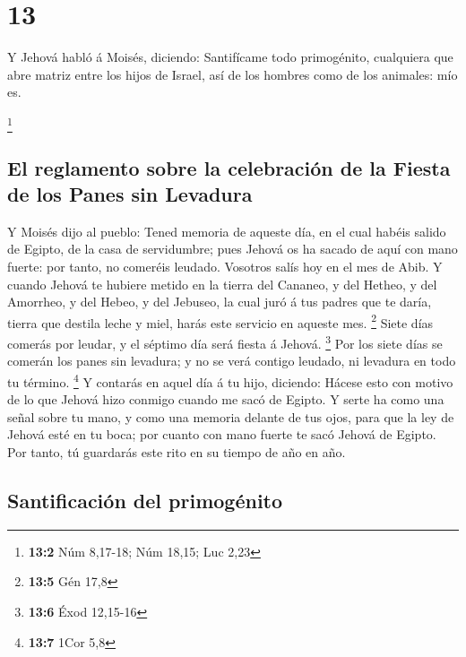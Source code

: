 \hypertarget{section-12}{%
\section{13}\label{section-12}}

 Y Jehová habló á Moisés, diciendo: 
Santifícame todo primogénito, cualquiera que abre matriz entre los hijos
de Israel, así de los hombres como de los animales: mío es.

\footnote{\textbf{13:2} Núm 8,17-18; Núm 18,15; Luc 2,23}

\hypertarget{el-reglamento-sobre-la-celebraciuxf3n-de-la-fiesta-de-los-panes-sin-levadura}{%
\subsection{El reglamento sobre la celebración de la Fiesta de los Panes
sin
Levadura}\label{el-reglamento-sobre-la-celebraciuxf3n-de-la-fiesta-de-los-panes-sin-levadura}}

 Y Moisés dijo al pueblo: Tened memoria de aqueste día, en
el cual habéis salido de Egipto, de la casa de servidumbre; pues Jehová
os ha sacado de aquí con mano fuerte: por tanto, no comeréis leudado.
 Vosotros salís hoy en el mes de Abib.  Y
cuando Jehová te hubiere metido en la tierra del Cananeo, y del Hetheo,
y del Amorrheo, y del Hebeo, y del Jebuseo, la cual juró á tus padres
que te daría, tierra que destila leche y miel, harás este servicio en
aqueste mes. \footnote{\textbf{13:5} Gén 17,8}  Siete días
comerás por leudar, y el séptimo día será fiesta á Jehová. \footnote{\textbf{13:6}
  Éxod 12,15-16}  Por los siete días se comerán los panes
sin levadura; y no se verá contigo leudado, ni levadura en todo tu
término. \footnote{\textbf{13:7} 1Cor 5,8}  Y contarás en
aquel día á tu hijo, diciendo: Hácese esto con motivo de lo que Jehová
hizo conmigo cuando me sacó de Egipto.  Y serte ha como
una señal sobre tu mano, y como una memoria delante de tus ojos, para
que la ley de Jehová esté en tu boca; por cuanto con mano fuerte te sacó
Jehová de Egipto.  Por tanto, tú guardarás este rito en
su tiempo de año en año.

\hypertarget{santificaciuxf3n-del-primoguxe9nito}{%
\subsection{Santificación del
primogénito}\label{santificaciuxf3n-del-primoguxe9nito}}

